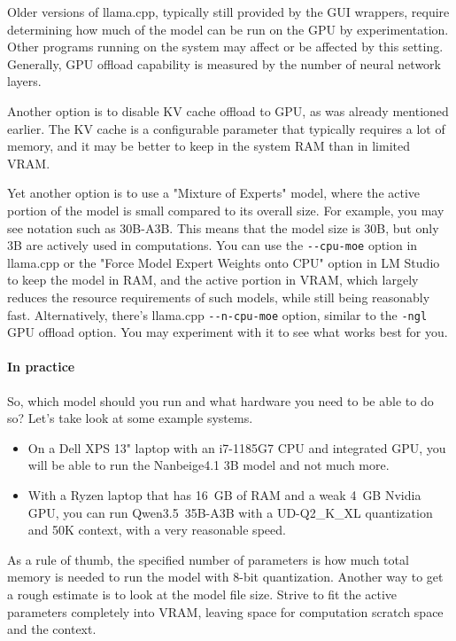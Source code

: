 \documentclass[hidelinks,titlepage,a4paper,twoside]{article}
\begin{document}
Older versions of llama.cpp, typically still provided by the GUI wrappers, require determining how much of the model can be run on the GPU by experimentation. Other programs running on the system may affect or be affected by this setting. Generally, GPU offload capability is measured by the number of neural network layers.

Another option is to disable KV cache offload to GPU, as was already mentioned earlier. The KV cache is a configurable parameter that typically requires a lot of memory, and it may be better to keep in the system RAM than in limited VRAM.

Yet another option is to use a "Mixture of Experts" model, where the active portion of the model is small compared to its overall size. For example, you may see notation such as 30B-A3B. This means that the model size is 30B, but only 3B are actively used in computations. You can use the \texttt{-{}-cpu-moe} option in llama.cpp or the "Force Model Expert Weights onto CPU" option in LM Studio to keep the model in RAM, and the active portion in VRAM, which largely reduces the resource requirements of such models, while still being reasonably fast. Alternatively, there's llama.cpp \texttt{-{}-n-cpu-moe} option, similar to the \texttt{-ngl} GPU offload option. You may experiment with it to see what works best for you.

\paragraph{In practice}

So, which model should you run and what hardware you need to be able to do so? Let's take look at some example systems.

\begin{itemize}
\item On a Dell XPS 13" laptop with an i7-1185G7 CPU and integrated GPU, you will be able to run the Nanbeige4.1 3B model and not much more.
\item With a Ryzen laptop that has 16~GB of RAM and a weak 4~GB Nvidia GPU, you can run Qwen3.5~35B-A3B with a UD-Q2\_K\_XL quantization and 50K context, with a very reasonable speed.
\end{itemize}

As a rule of thumb, the specified number of parameters is how much total memory is needed to run the model with 8-bit quantization. Another way to get a rough estimate is to look at the model file size. Strive to fit the active parameters completely into VRAM, leaving space for computation scratch space and the context.
\end{document}
